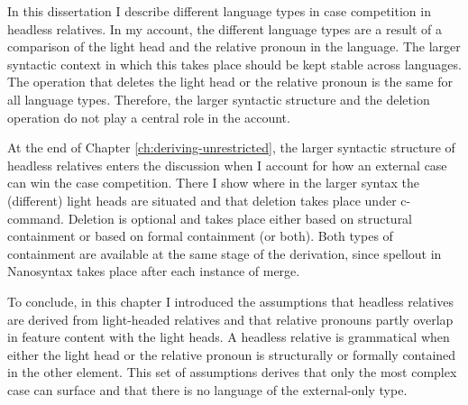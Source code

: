 In this dissertation I describe different language types in case competition in headless relatives. In my account, the different language types are a result of a comparison of the light head and the relative pronoun in the language.
The larger syntactic context in which this takes place should be kept stable across languages.
The operation that deletes the light head or the relative pronoun is the same for all language types. Therefore, the larger syntactic structure and the deletion operation do not play a central role in the account.

At the end of Chapter \ref{ch:deriving-unrestricted}, the larger syntactic structure of headless relatives enters the discussion when I account for how an external case can win the case competition. There I show where in the larger syntax the (different) light heads are situated and that deletion takes place under c-command.
Deletion is optional and takes place either based on structural containment or based on formal containment (or both). Both types of containment are available at the same stage of the derivation, since spellout in Nanosyntax takes place after each instance of merge.

To conclude, in this chapter I introduced the assumptions that headless relatives are derived from light-headed relatives and that relative pronouns partly overlap in feature content with the light heads. A headless relative is grammatical when either the light head or the relative pronoun is structurally or formally contained in the other element. This set of assumptions derives that only the most complex case can surface and that there is no language of the external-only type.
